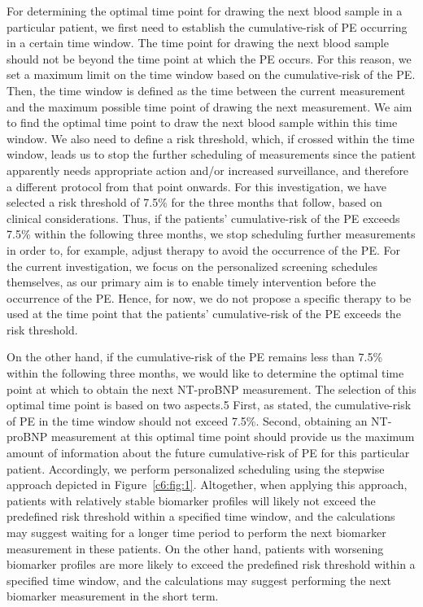 For determining the optimal time point for drawing the next blood sample in a particular patient, we first need to establish the cumulative-risk of PE occurring in a certain time window. The time point for drawing the next blood sample should not be beyond the time point at which the PE occurs. For this reason, we set a maximum limit on the time window based on the cumulative-risk of the PE. Then, the time window is defined as the time between the current measurement and the maximum possible time point of drawing the next measurement. We aim to find the optimal time point to draw the next blood sample within this time window. We also need to define a risk threshold, which, if crossed within the time window, leads us to stop the further scheduling of measurements since the patient apparently needs appropriate action and/or increased surveillance, and therefore a different protocol from that point onwards. For this investigation, we have selected a risk threshold of 7.5\% for the three months that follow, based on clinical considerations. Thus, if the patients' cumulative-risk of the PE exceeds 7.5\% within the following three months, we stop scheduling further measurements in order to, for example, adjust therapy to avoid the occurrence of the PE. For the current investigation, we focus on the personalized screening schedules themselves, as our primary aim is to enable timely intervention before the occurrence of the PE. Hence, for now, we do not propose a specific therapy to be used at the time point that the patients' cumulative-risk of the PE exceeds the risk threshold. 

On the other hand, if the cumulative-risk of the PE remains less than 7.5\% within the following three months, we would like to determine the optimal time point at which to obtain the next NT-proBNP measurement. The selection of this optimal time point is based on two aspects.5 First, as stated, the cumulative-risk of PE in the time window should not exceed 7.5\%. Second, obtaining an NT-proBNP measurement at this optimal time point should provide us the maximum amount of information about the future cumulative-risk of PE for this particular patient. Accordingly, we perform personalized scheduling using the stepwise approach depicted in Figure~\ref{c6:fig:1}. Altogether, when applying this approach, patients with relatively stable biomarker profiles will likely not exceed the predefined risk threshold within a specified time window, and the calculations may suggest waiting for a longer time period to perform the next biomarker measurement in these patients. On the other hand, patients with worsening biomarker profiles are more likely to exceed the predefined risk threshold within a specified time window, and the calculations may suggest performing the next biomarker measurement in the short term.

